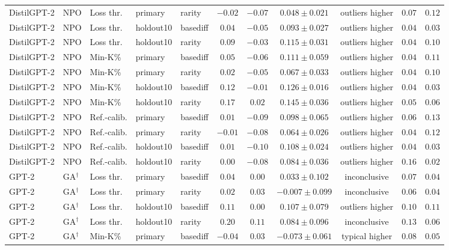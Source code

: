 {\begin{longtable}{@{\extracolsep{\fill}}lllllcccccc@{}}
DistilGPT-2 & NPO & Loss thr. & primary & rarity & $-0.02$ & $-0.07$ & $0.048 \pm 0.021$ & outliers higher & $0.07$ & $0.12$ \\
DistilGPT-2 & NPO & Loss thr. & holdout10 & basediff & $0.04$ & $-0.05$ & $0.093 \pm 0.027$ & outliers higher & $0.04$ & $0.03$ \\
DistilGPT-2 & NPO & Loss thr. & holdout10 & rarity & $0.09$ & $-0.03$ & $0.115 \pm 0.031$ & outliers higher & $0.04$ & $0.10$ \\
DistilGPT-2 & NPO & Min-K\% & primary & basediff & $0.05$ & $-0.06$ & $0.111 \pm 0.059$ & outliers higher & $0.04$ & $0.11$ \\
DistilGPT-2 & NPO & Min-K\% & primary & rarity & $0.02$ & $-0.05$ & $0.067 \pm 0.033$ & outliers higher & $0.04$ & $0.10$ \\
DistilGPT-2 & NPO & Min-K\% & holdout10 & basediff & $0.12$ & $-0.01$ & $0.126 \pm 0.016$ & outliers higher & $0.04$ & $0.03$ \\
DistilGPT-2 & NPO & Min-K\% & holdout10 & rarity & $0.17$ & $0.02$ & $0.145 \pm 0.036$ & outliers higher & $0.05$ & $0.06$ \\
DistilGPT-2 & NPO & Ref.-calib. & primary & basediff & $0.01$ & $-0.09$ & $0.098 \pm 0.065$ & outliers higher & $0.06$ & $0.13$ \\
DistilGPT-2 & NPO & Ref.-calib. & primary & rarity & $-0.01$ & $-0.08$ & $0.064 \pm 0.026$ & outliers higher & $0.04$ & $0.12$ \\
DistilGPT-2 & NPO & Ref.-calib. & holdout10 & basediff & $0.01$ & $-0.10$ & $0.108 \pm 0.024$ & outliers higher & $0.04$ & $0.03$ \\
DistilGPT-2 & NPO & Ref.-calib. & holdout10 & rarity & $0.00$ & $-0.08$ & $0.084 \pm 0.036$ & outliers higher & $0.16$ & $0.02$ \\
GPT-2 & GA$^{\dagger}$ & Loss thr. & primary & basediff & $0.04$ & $0.00$ & $0.033 \pm 0.102$ & inconclusive & $0.07$ & $0.04$ \\
GPT-2 & GA$^{\dagger}$ & Loss thr. & primary & rarity & $0.02$ & $0.03$ & $-0.007 \pm 0.099$ & inconclusive & $0.06$ & $0.04$ \\
GPT-2 & GA$^{\dagger}$ & Loss thr. & holdout10 & basediff & $0.11$ & $0.00$ & $0.107 \pm 0.079$ & outliers higher & $0.10$ & $0.11$ \\
GPT-2 & GA$^{\dagger}$ & Loss thr. & holdout10 & rarity & $0.20$ & $0.11$ & $0.084 \pm 0.096$ & inconclusive & $0.13$ & $0.06$ \\
GPT-2 & GA$^{\dagger}$ & Min-K\% & primary & basediff & $-0.04$ & $0.03$ & $-0.073 \pm 0.061$ & typical higher & $0.08$ & $0.05$ \\

\end{longtable}}
